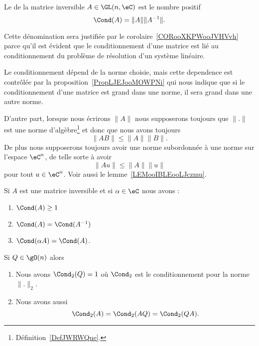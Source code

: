 \begin{definition}      \label{DEFooBKQWooJuoCGX}
	Le  de la matrice inversible \( A\in \GL(n,\eC)\) est le nombre positif
	\begin{equation}
		\Cond(A)=\| A \|\| A^{-1} \|.
	\end{equation}
\end{definition}

Cette dénomination sera justifiée par le corolaire~\ref{CORooXKPWooJVHVvh} parce qu'il est évident que le conditionnement d'une matrice est lié au conditionnement du problème de résolution d'un système linéaire.

\begin{remark}
	Le conditionnement dépend de la norme choisie, mais cette dependence est contrôlée par la proposition~\ref{PropLJEJooMOWPNi} qui nous indique que si le conditionnement d'une matrice est grand dans une norme, il sera grand dans une autre norme.

	D'autre part, lorsque nous écrirons \( \| A \|\) nous supposerons toujours que \( \| . \|\) est une norme d'algèbre\footnote{Définition~\ref{DefJWRWQue}.} et donc que nous avons toujours
	\begin{equation}
		\| AB \|\leq \| A \|\| B \|.
	\end{equation}
	De plus nous supposerons toujours avoir une norme subordonnée à une norme sur l'espace \( \eC^n\), de telle sorte à avoir
	\begin{equation}
		\| Au \|\leq \| A \|\| u \|
	\end{equation}
	pour tout \( u\in\eC^n\). Voir aussi le lemme~\ref{LEMooIBLEooLJczmu}.
\end{remark}

\begin{proposition}
	Si \( A\) est une matrice inversible et si \( \alpha\in \eC\) nous avons :
	\begin{enumerate}
		\item
		      \( \Cond(A)\geq 1\)
		\item
		      \( \Cond(A)=\Cond(A^{-1})\)
		\item
		      \( \Cond(\alpha A)=\Cond(A)\).
	\end{enumerate}
	Si \( Q\in\gO(n)\) alors
	\begin{enumerate}
		\item
		      Nous avons \( \Cond_2(Q)=1\) où \( \Cond_2\) est le conditionnement pour la norme \( \| . \|_2\).
		\item
		      Nous avons aussi
		      \begin{equation}
			      \Cond_2(A)=\Cond_2(AQ)=\Cond_2(QA).
		      \end{equation}
	\end{enumerate}
\end{proposition}

